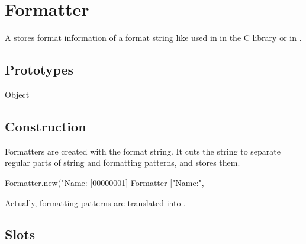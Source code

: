 
\section{Formatter}

A  stores format information of a format string like
used in  in the C library or in .

\subsection{Prototypes}

\begin{refObjects}
\item[Object]
\end{refObjects}

\subsection{Construction}

Formatters are created with the format string. It cuts the string to
separate regular parts of string and formatting patterns, and stores
them.

\begin{urbiscript}[firstnumber=1]
Formatter.new("Name:%
[00000001] Formatter ["Name:", %
\end{urbiscript}

Actually, formatting patterns are translated into
.

\subsection{Slots}

